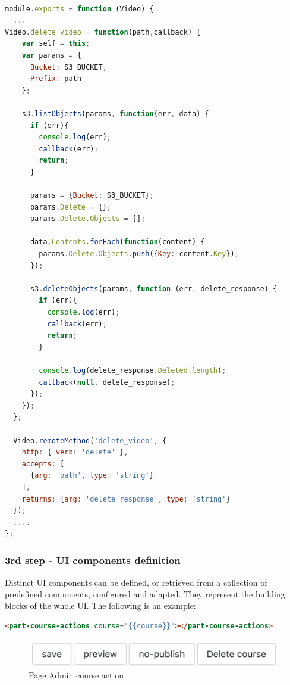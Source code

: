 \begin{lstlisting}[language=javascript]

module.exports = function (Video) {
  ...
Video.delete_video = function(path,callback) {
    var self = this;
    var params = {
      Bucket: S3_BUCKET,
      Prefix: path
    };

    s3.listObjects(params, function(err, data) {
      if (err){
        console.log(err);
        callback(err);
        return;
      } 

      params = {Bucket: S3_BUCKET};
      params.Delete = {};
      params.Delete.Objects = [];

      data.Contents.forEach(function(content) {
        params.Delete.Objects.push({Key: content.Key});
      });

      s3.deleteObjects(params, function (err, delete_response) {
        if (err){
          console.log(err);
          callback(err);
          return;
        }

        console.log(delete_response.Deleted.length);
        callback(null, delete_response);
      });
    });
  };

  Video.remoteMethod('delete_video', {
    http: { verb: 'delete' },
    accepts: [
      {arg: 'path', type: 'string'}
    ],
    returns: {arg: 'delete_response', type: 'string'}
  });
  ....
};
\end{lstlisting}

\subsubsection {3rd step - UI components definition}
\label{subsec:3rd_step_UI_components_definition}

Distinct UI components can be defined, or retrieved from a collection of predefined components, configured and adapted. They represent the building blocks of the whole UI.
{\color{red}The following is an example:}

\begin{lstlisting}[language=html]
<part-course-actions course="{{course}}"></part-course-actions>
\end{lstlisting}

\begin{figure}[htb] %
 \centering
 \includegraphics[width=1.0\linewidth]{images/chapter4/admin-course-actions.png}\hfill
 \caption[Page Admin course action]{Page Admin course action}
 \label{fig:fourV}
\end{figure}

